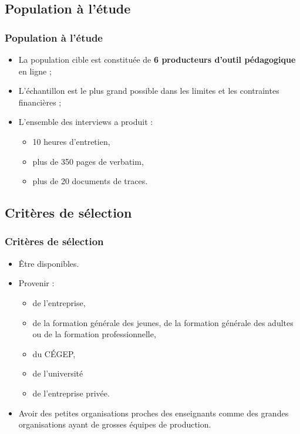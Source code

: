                      	\subsection{Population à l’étude} 
					\begin{frame}[allowframebreaks]
						\frametitle{Population à l’étude}
                        
                        			\begin{itemize} 
                       				 \item La population cible est constituée de \textbf{6 producteurs d’outil pédagogique }en ligne ;										 \item L’échantillon est le plus grand possible dans les limites et les contraintes financières ; 
                       		              \item L’ensemble des interviews a produit :
                       		              \begin{itemize} 
                       		              	\item 10 heures d’entretien,
                       		              	\item plus de 350 pages de verbatim,
                       		              	\item plus de 20 documents de traces.
                       		              \end{itemize}
                       		 \end{itemize}
                       		 \end{frame}
				\subsection{Critères de sélection} 
					\begin{frame}[allowframebreaks]
						\frametitle{Critères de sélection}
                        
                        			\begin{itemize} 
                       				\item Être disponibles.
							\item Provenir :
							\begin{itemize}
								\item de l’entreprise, 
								\item de la formation générale des jeunes, de la formation générale des adultes ou de la formation professionnelle, 
								\item du CÉGEP, 
								\item de l’université 
								\item de l’entreprise privée.
							\end{itemize}
							\item Avoir des petites organisations proches des enseignants comme des grandes organisations ayant de grosses équipes de production.
                       		 \end{itemize}
                       		 \end{frame}

